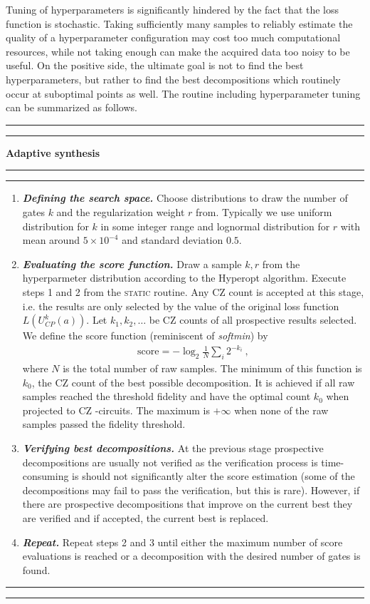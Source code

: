 \documentclass[draft, twocolumn, amsfonts, amssymb, aps, nofootinbib]{revtex4-2}
\newcommand{\CZ}{\textsf{CZ }}
\newcommand{\static}{\textsc{static }}
\begin{document}
Tuning of hyperparameters is significantly hindered by the fact that the loss function is stochastic. Taking sufficiently many samples to reliably estimate the quality of a hyperparameter configuration may cost too much computational resources, while not taking enough can make the acquired data too noisy to be useful. On the positive side, the ultimate goal is not to find the best hyperparameters, but rather to find the best decompositions which routinely occur at suboptimal points as well. The routine including hyperparameter tuning can be summarized as follows.
\\[6pt]
\hrule
\hrule
\vspace{6pt}
{\large\textbf{\qquad Adaptive synthesis}}
\vspace{6pt}
\hrule
\hrule
\begin{enumerate}
\item \textit{\textbf{Defining the search space.}} Choose distributions to draw the number of gates $k$ and the regularization weight $r$ from. Typically we use uniform distribution for $k$ in some integer range and lognormal distribution for $r$ with mean around $5\times 10^{-4}$ and standard deviation $0.5$.
\item \textit{\textbf{Evaluating the score function.}} Draw a sample $k, r$ from the hyperparmeter distribution according to the Hyperopt algorithm. Execute steps 1 and 2 from the \static routine. Any \CZ count is accepted at this stage, i.e. the results are only selected by the value of the original loss function $L(U_{CP}^k(a))$. Let $k_1, k_2,\dots$ be \CZ counts of all prospective results selected. We define the score function (reminiscent of \textit{softmin}) by
\begin{align}
\text{score}=-\log_2\frac{1}{N}\sum_{i}2^{-k_i} \label{score} \ ,
\end{align}
where $N$ is the total number of raw samples. The minimum of this function is $k_0$, the \CZ count of the best possible decomposition. It is achieved if all raw samples reached the threshold fidelity and have the optimal count $k_0$ when projected to \CZ-circuits. The maximum is $+\infty$ when none of the raw samples passed the fidelity threshold.
\item \textit{\textbf{Verifying best decompositions.}} At the previous stage prospective decompositions are usually not verified as the verification process is time-consuming is should not significantly alter the score estimation (some of the decompositions may fail to pass the verification, but this is rare). However, if there are prospective decompositions that improve on the current best they are verified and if accepted, the current best is replaced.

\item \textit{\textbf{Repeat.}} Repeat steps 2 and 3 until either the maximum number of score evaluations is reached or a decomposition with the desired number of gates is found.
\end{enumerate}
\hrule
\hrule
\vspace{6pt}
\end{document}
